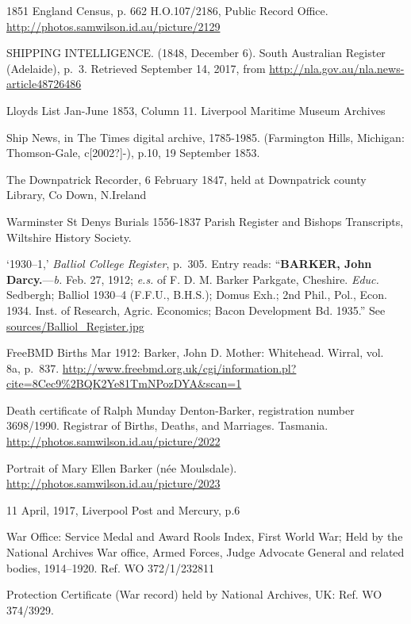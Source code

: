 \begin{thebibliography}{99}
	1851 England Census, p. 662 H.O.107/2186, Public Record Office.
	\url{http://photos.samwilson.id.au/picture/2129}

	SHIPPING INTELLIGENCE. (1848, December 6). South Australian Register (Adelaide), p.~3.
	Retrieved September 14, 2017, from \url{http://nla.gov.au/nla.news-article48726486}

	Lloyds List Jan-June 1853, Column 11.  Liverpool Maritime Museum Archives

	Ship News, in The Times digital archive, 1785-1985. (Farmington Hills, Michigan: Thomson-Gale, c[2002?]-), 	p.10, 19 September 1853.

	The Downpatrick Recorder, 6 February 1847, held at Downpatrick county Library, Co Down, N.Ireland

	Warminster St Denys Burials 1556-1837 Parish Register and Bishops Transcripts, Wiltshire History Society.

	`1930--1,' \emph{Balliol College Register}, p.~305. Entry reads:
	``\textbf{BARKER, John Darcy.}---\emph{b.} Feb. 27, 1912; \emph{e.s.} of F. D. M. Barker Parkgate, Cheshire. \emph{Educ.} Sedbergh; Balliol 1930--4 (F.F.U., B.H.S.); Domus Exh.; 2nd Phil., Pol., Econ. 1934. Inst. of Research, Agric. Economics; Bacon Development Bd. 1935.''
	See \url{sources/Balliol_Register.jpg}

	FreeBMD Births Mar 1912: Barker, John D. Mother: Whitehead. Wirral, vol.~ 8a, p.~837.
	\url{http://www.freebmd.org.uk/cgi/information.pl?cite=8Cec9\%2BQK2Ye81TmNPozDYA&scan=1}

	Death certificate of Ralph Munday Denton-Barker, registration number 3698/1990. Registrar of Births, Deaths, and Marriages. Tasmania.
	\url{http://photos.samwilson.id.au/picture/2022}

	Portrait of Mary Ellen Barker (n\'{e}e Moulsdale).
	\url{http://photos.samwilson.id.au/picture/2023}

	11 April, 1917, Liverpool Post and Mercury, p.6

	War Office: Service Medal and Award Rools Index, First World War; Held by the National Archives War office, 	Armed Forces, Judge Advocate General and related bodies, 1914--1920. Ref. WO 372/1/232811

	Protection Certificate (War record) held by National Archives, UK: Ref. WO 374/3929.


\end{thebibliography}
